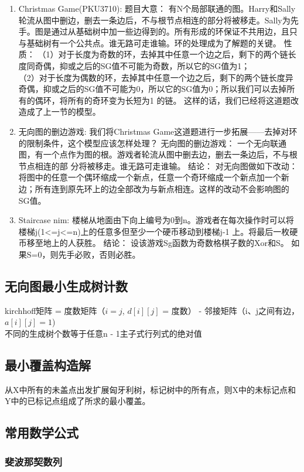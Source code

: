 \documentclass[landscape,a4paper]{article}
\begin{document}
\begin{spacing}{0.3}
\begin{multicols}{2}
\begin{enumerate}
	\item Christmas Game(PKU3710):
		题目大意：
		有N个局部联通的图。Harry和Sally轮流从图中删边，删去一条边后，不与根节点相连的部分将被移走。Sally为先手。图是通过从基础树中加一些边得到的。所有形成的环保证不共用边，且只与基础树有一个公共点。谁无路可走谁输。环的处理成为了解题的关键。
		性质：
		（1）对于长度为奇数的环，去掉其中任意一个边之后，剩下的两个链长度同奇偶，抑或之后的SG值不可能为奇数，所以它的SG值为1；\\
		（2）对于长度为偶数的环，去掉其中任意一个边之后，剩下的两个链长度异奇偶，抑或之后的SG值不可能为0，所以它的SG值为0；所以我们可以去掉所有的偶环，将所有的奇环变为长短为1 的链。
		这样的话，我们已经将这道题改造成了上一节的模型。
	\item 无向图的删边游戏:
		我们将Christmas Game这道题进行一步拓展——去掉对环的限制条件，这个模型应该怎样处理？
		无向图的删边游戏：
		一个无向联通图，有一个点作为图的根。游戏者轮流从图中删去边，删去一条边后，不与根节点相连的部 分将被移走。谁无路可走谁输。
		结论：
		对无向图做如下改动：将图中的任意一个偶环缩成一个新点，任意一个奇环缩成一个新点加一个新边；所有连到原先环上的边全部改为与新点相连。这样的改动不会影响图的SG值。
	\item Staircase nim:
		楼梯从地面由下向上编号为0到n。游戏者在每次操作时可以将楼梯j(1<=j<=n)上的任意多但至少一个硬币移动到楼梯j-1 上。将最后一枚硬币移至地上的人获胜。
		结论：
		设该游戏Sg函数为奇数格棋子数的Xor和S。
		如果S=0，则先手必败，否则必胜。
\end{enumerate}




\subsection{无向图最小生成树计数}
kirchhoff矩阵 = 度数矩阵（$i = j$, $d[i][j]$ = 度数） - 邻接矩阵（i、j之间有边， $a[i][j] = 1$)\\
不同的生成树个数等于任意n - 1主子式行列式的绝对值

\subsection{最小覆盖构造解}
从X中所有的未盖点出发扩展匈牙利树，标记树中的所有点，则X中的未标记点和Y中的已标记点组成了所求的最小覆盖。

\subsection{常用数学公式}
\subsubsection{斐波那契数列}


\end{multicols}
\end{spacing}
\end{document}
